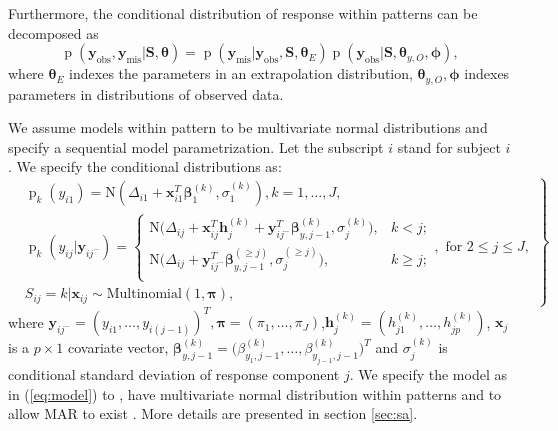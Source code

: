 \documentclass[12pt]{article}
\DeclareMathOperator{\pr}{p}
\newcommand{\yobs}{\bm y_{\text{obs}}}
\newcommand{\ymis}{\bm y_{\text{mis}}}
\begin{document}
Furthermore, the conditional distribution of response within patterns
can be decomposed as
\begin{equation}\label{eq:decompose}
  \pr (\yobs, \ymis | \bm S, \bm \theta) = \pr
  (\ymis|\yobs, \bm S, \bm \theta_E) \pr (\yobs | \bm S, \bm
  \theta_{y, O}, \bm \phi),
\end{equation}
where $\bm \theta_E$ indexes the parameters in an extrapolation
distribution, $\bm \theta_{y, O}, \bm \phi$ indexes parameters in
distributions of observed data.

We assume models within pattern to be multivariate normal
distributions and specify a sequential model parametrization. Let the
subscript $i$ stand for subject $i$. We specify the conditional
distributions as:
\begin{equation}
  \label{eq:model}
  \left.  \begin{aligned}
      & \pr_k(y_{i1}) = \textrm{N} (\Delta_{i1} + \bm x_{i1}^T \bm \beta_1^{(k)},
      \sigma_1^{(k)}  ), k = 1, \ldots, J,\\
      &\pr_k(y_{ij}|\bm y_{ij^{-}}) =
      \begin{cases}
        \textrm{N} \big (\Delta_{ij} + \bm x_{ij}^T \bm h_{j}^{(k)} +
        \bm y_{ij^{-}}^T \bm \beta_{y,j-1}^{(k)},
        \sigma_j^{(k)} \big), & k < j ;  \\
        \textrm{N} \big (\Delta_{ij} + \bm y_{ij^{-}}^T \bm
        \beta_{y,j-1}^{(\geq j)},
        \sigma_j^{(\geq j)} \big), & k \geq j ;  \\
      \end{cases}, \text{ for } 2 \leq j \leq J,  \\
      &S_{ij} = k| \bm x_{ij} \sim \textrm{Multinomial}(1, \bm \pi),
    \end{aligned} \right\}
\end{equation}
where $\bm y_{ij^{-}} = (y_{i1}, \ldots, y_{i(j-1)})^T, \bm \pi =
(\pi_1, \ldots, \pi_J)$,$\bm h_j^{(k)} = (h_{j1}^{(k)}, \ldots,
h_{jp}^{(k)})$, $\bm x_j$ is a $p \times 1$ covariate vector, $\bm
\beta_{y, j-1}^{(k)} = \big(\beta_{y_1, j-1}^{(k)}, \ldots,
\beta_{y_{j-1}, j-1}^{(k)} \big)^T$ and $\sigma_j^{(k)}$ is
conditional standard deviation of response component $j$. We specify
the model as in (\ref{eq:model}) to , have multivariate normal
distribution within patterns and to allow MAR to exist
\citep{wang2011}. More details are presented in section \ref{sec:sa}.
\end{document}
